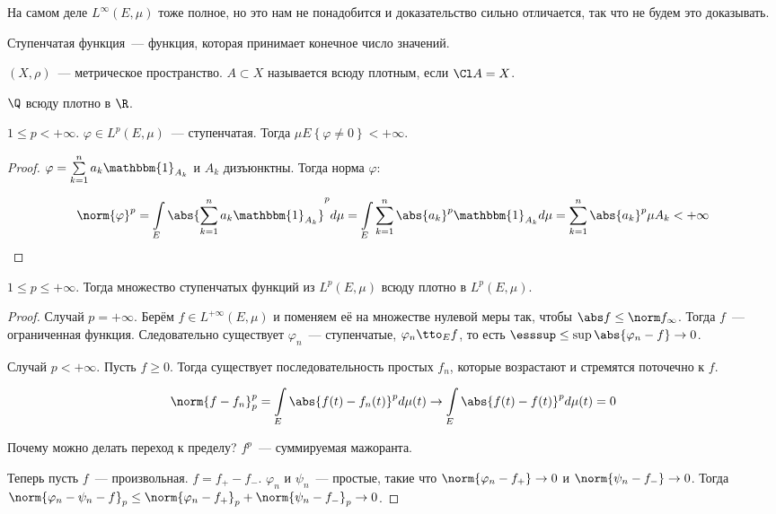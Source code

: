\begin{observation}
    На самом деле $L^{\infty}(E, \mu)$ тоже полное,
    но это нам не понадобится и доказательство
    сильно отличается, так что не будем это доказывать.
\end{observation}

\begin{definition}
    Ступенчатая функция~--- функция, которая принимает конечное число значений.
\end{definition}

\begin{definition}
    $(X, \rho)$~--- метрическое пространство.
    $A \subset X$ называется всюду плотным, если $\Cl A = X$.
\end{definition}

\begin{example}
    $\Q$ всюду плотно в $\R$.
\end{example}

\begin{lemma}
    $1 \le p < +\infty$. $\varphi \in L^p(E, \mu)$~--- ступенчатая.
    Тогда $\mu E \left\{ \varphi \ne 0 \right\} < +\infty$.
\end{lemma}

\begin{proof}
    $\varphi = \sum\limits_{k=1}^{n} a_k \mathbbm{1}_{A_k}$ и $A_k$ дизъюнктны.
    Тогда норма $\varphi$:

    \[
        \norm{\varphi}^p = \int\limits_E \abs{\sum\limits_{k=1}^n a_k \mathbbm{1}_{A_k}}^p d\mu
        = \int\limits_E \sum\limits_{k=1}^n \abs{a_k}^p \mathbbm{1}_{A_k} d\mu
        = \sum\limits_{k=1}^n \abs{a_k}^p \mu A_k < +\infty
    \]
\end{proof}

\begin{theorem}
    $1 \le p \le +\infty$.
    Тогда множество ступенчатых функций из $L^p(E, \mu)$
    всюду плотно в $L^p(E, \mu)$.
\end{theorem}

\begin{proof}
    Случай $p = +\infty$.
    Берём $f \in L^{+\infty}(E, \mu)$ и поменяем её на множестве нулевой
    меры так, чтобы $\abs f \le \norm f_\infty$. Тогда $f$~--- ограниченная функция.
    Следовательно существует $\varphi_n$~--- ступенчатые,
    $\varphi_n \tto_E f$, то есть $\esssup \le \sup \abs{\varphi_n - f} \to 0$.

    Случай $p < +\infty$.
    Пусть $f \ge 0$. Тогда существует последовательность простых
    $f_n$, которые возрастают и стремятся поточечно к $f$.

    \[
        \norm{f - f_n}^p_p = \int\limits_E \abs{f(t) - f_n(t)}^p d\mu(t)
        \to \int\limits_E \abs{f(t) - f(t)}^p d\mu(t) = 0
    \]

    Почему можно делать переход к пределу?
    $f^p$~--- суммируемая мажоранта.

    Теперь пусть $f$~--- произвольная.
    $f = f_+ - f_-$.
    $\varphi_n$ и $\psi_n$~--- простые, такие что
    $\norm{\varphi_n - f_+} \to 0$ и $\norm{\psi_n - f_-} \to 0$.
    Тогда $\norm{\varphi_n - \psi_n - f}_p \le \norm{\varphi_n - f_+}_p
        + \norm{\psi_n - f_-}_p \to 0$.
\end{proof}


